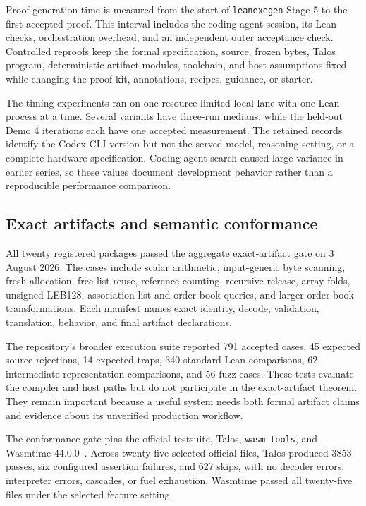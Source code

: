 \documentclass[11pt]{article}
\newcommand{\leanexegen}{\texttt{leanexegen}}
\newcommand{\code}[1]{\texttt{#1}}
\begin{document}
Proof-generation time is measured from the start of \leanexegen{} Stage 5 to the first accepted proof.  This interval includes the coding-agent session, its Lean checks, orchestration overhead, and an independent outer acceptance check.  Controlled reproofs keep the formal specification, source, frozen bytes, Talos program, deterministic artifact modules, toolchain, and host assumptions fixed while changing the proof kit, annotations, recipes, guidance, or starter.

The timing experiments ran on one resource-limited local lane with one Lean process at a time.  Several variants have three-run medians, while the held-out Demo 4 iterations each have one accepted measurement.  The retained records identify the Codex CLI version but not the served model, reasoning setting, or a complete hardware specification.  Coding-agent search caused large variance in earlier series, so these values document development behavior rather than a reproducible performance comparison.

\subsection{Exact artifacts and semantic conformance}

All twenty registered packages passed the aggregate exact-artifact gate on 3 August 2026.  The cases include scalar arithmetic, input-generic byte scanning, fresh allocation, free-list reuse, reference counting, recursive release, array folds, unsigned LEB128, association-list and order-book queries, and larger order-book transformations.  Each manifest names exact identity, decode, validation, translation, behavior, and final artifact declarations.

The repository's broader execution suite reported 791 accepted cases, 45 expected source rejections, 14 expected traps, 340 standard-Lean comparisons, 62 intermediate-representation comparisons, and 56 fuzz cases.  These tests evaluate the compiler and host paths but do not participate in the exact-artifact theorem.  They remain important because a useful system needs both formal artifact claims and evidence about its unverified production workflow.

The conformance gate pins the official testsuite, Talos, \code{wasm-tools}, and Wasmtime 44.0.0~\cite{WasmTestsuite,WasmtimeSoftware}.  Across twenty-five selected official files, Talos produced 3853 passes, six configured assertion failures, and 627 skips, with no decoder errors, interpreter errors, cascades, or fuel exhaustion.  Wasmtime passed all twenty-five files under the selected feature setting.
\end{document}
